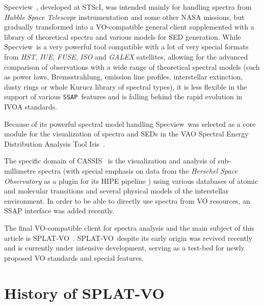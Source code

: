 \documentclass[final,authoryear,5p,times,twocolumn]{elsarticle}
\newcommand{\ssap}{\texttt{SSAP}}
\newcommand{\splatvo}{{\textsf{\small{SPLAT-VO}}}}
\newcommand{\specview}{\textsf{\small Specview}}
\newcommand{\iris}{\textsf{\small Iris}}
\newcommand{\cassis}{\textsf{\small CASSIS}}
\newcommand{\ascl}[1]{\href{http://www.ascl.net/#1}{ascl:#1}}
\begin{document}
\specview\ \citep[][\ascl{1210.016}]{2002SPIE.4847..410B}, developed at STScI,
was intended mainly for handling spectra from \emph{Hubble Space Telescope}
instrumentation and some other NASA missions, but gradually transformed into a
VO-compatible general client supplemented with a library of theoretical spectra
and various models for SED generation.  While \specview\ is a very powerful
tool compatible with a lot of very special formats from \emph{HST}, \emph{IUE},
\emph{FUSE}, \emph{ISO} and \emph{GALEX} satellites, allowing for the advanced
comparison of observations with a wide range of theoretical spectral models
(such as power laws, Bremsstrahlung, emission line profiles, interstellar
extinction, dusty rings or whole Kurucz library of spectral types), it is less
flexible in the support of various \ssap\ features and is falling behind the
rapid evolution in IVOA standards.

Because of its powerful spectral model handling \specview\   was  selected as a
core module for the visualization of spectra and SEDs in the VAO Spectral
Energy Distribution Analysis Tool \iris\
\citep[][\ascl{1205.007}]{2014ASPC..485...19L}.

The specific domain of \cassis\ \citep[][\ascl{1402.013}]{2011IAUS..280P.120C}
is the visualization and analysis of  sub-millimetre  spectra (with special
emphasis on data from the \emph{Herschel Space Observatory} as a plugin for its
HIPE pipeline \citep[][\ascl{1111.001}]{2012ASPC..461..733B}) using various
databases of atomic and molecular transitions and several physical models of
the interstellar environment. In order to be able to directly use spectra from
VO resources, an SSAP interface was added recently. 

The final VO-compatible client for spectra analysis and the main subject of
this article is \splatvo\ \citep[][\ascl{1402.008}]{sun243}.  \splatvo\ despite
its early origin was revived recently and is currently under intensive
development, serving as a test-bed for newly proposed VO standards and special
features.

\section{History of SPLAT-VO}
%
\end{document}
